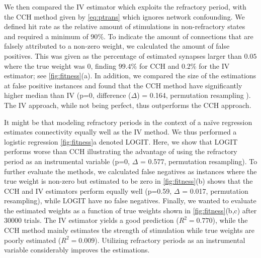 \documentclass[11pt]{article}
\begin{document}
We then compared the IV estimator which exploits the refractory period, with the CCH method given by \cref{eq:ptrans} which ignores network confounding. 
We defined hit rate as the relative amount of stimulations in non-refractory states and required a minimum of 90$\%$. 
To indicate the amount of connections that are falsely attributed to a non-zero weight, we calculated the amount of false positives. 
This was given as the percentage of estimated synapses larger than $ 0.05 $ where the true weight was $ 0 $, finding $ 99.4\% $ for CCH and $ 0.2\% $ for the IV estimator; see \cref{fig:fitness}(a). 
In addition, we compared the size of the estimations at false positive instances and found that the CCH method have significantly higher median than IV (p=0, difference ($\Delta$) = 0.164, permutation resampling \citep{wassermann2006all}). 
The IV approach, while not being perfect, thus outperforms the CCH approach.

It might be that modeling refractory periods in the context of a na\"ive regression estimates connectivity equally well as the IV method. 
We thus performed a logistic regression \cref{fig:fitness}a denoted LOGIT. 
Here, we show that LOGIT performs worse than CCH illustrating the advantage of using the refractory period as an instrumental variable (p=0, $\Delta$ = 0.577, permutation resampling). 
To further evaluate the methods, we calculated false negatives as instances where the true weight is non-zero but estimated to be zero in \cref{fig:fitness}(b) shows that the CCH and IV estimators perform equally well (p=0.59, $\Delta$ = 0.017, permutation resampling), while LOGIT have no false negatives. 
Finally, we wanted to evaluate the estimated weights as a function of true weights shown in \cref{fig:fitness}(b,c) after 30000 trials. 
The IV estimator yields a good prediction ($ R^2 = 0.770 $), while the CCH method mainly estimates the strength of stimulation while true weights are poorly estimated ($ R^2 = 0.009 $). Utilizing refractory periods as an instrumental variable considerably improves the estimations.
\end{document}
